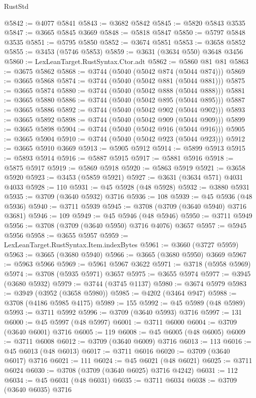 \begin{lexlean}{RustStd}
\begin{coremodule}
@5842 := @4077 @5841
@5843 := @3682 @5842
@5845 := @5820 @5843 @3535
@5847 := @3665 @5845 @3669
@5848 := @5818 @5847
@5850 := @5797 @5848 @3535
@5851 := @5795 @5850
@5852 := @3674 @5851
@5853 := @3658 @5852
@5855 := @3453 (@5746 @5853)
@5859 := @3631 (@3634 @550) @3648 @3456
@5860 := LexLeanTarget.RustSyntax.Ctor.adt
@5862 := @5860 @81 @81
@5863 := @3675 @5862
@5868 := @3744 (@5040 (@5042 @874 (@5044 @874)))
@5869 := @3665 @5868
@5874 := @3744 (@5040 (@5042 @881 (@5044 @881)))
@5875 := @3665 @5874
@5880 := @3744 (@5040 (@5042 @888 (@5044 @888)))
@5881 := @3665 @5880
@5886 := @3744 (@5040 (@5042 @895 (@5044 @895)))
@5887 := @3665 @5886
@5892 := @3744 (@5040 (@5042 @902 (@5044 @902)))
@5893 := @3665 @5892
@5898 := @3744 (@5040 (@5042 @909 (@5044 @909)))
@5899 := @3665 @5898
@5904 := @3744 (@5040 (@5042 @916 (@5044 @916)))
@5905 := @3665 @5904
@5910 := @3744 (@5040 (@5042 @923 (@5044 @923)))
@5912 := @3665 @5910 @3669
@5913 := @5905 @5912
@5914 := @5899 @5913
@5915 := @5893 @5914
@5916 := @5887 @5915
@5917 := @5881 @5916
@5918 := @5875 @5917
@5919 := @5869 @5918
@5920 := @5863 @5919
@5921 := @3658 @5920
@5923 := @3453 (@5859 @5921)
@5927 := @3631 (@3634 @571) @4031 @4033
@5928 := 110
@5931 := @45 @5928 (@48 @5928)
@5932 := @3880 @5931
@5935 := @3709 (@3640 @5932) @3716
@5936 := 108
@5939 := @45 @5936 (@48 @5936)
@5940 := @3711 @5939
@5945 := @3708 (@3709 (@3640 @5940) @3716 @3681)
@5946 := 109
@5949 := @45 @5946 (@48 @5946)
@5950 := @3711 @5949
@5956 := @3708 (@3709 (@3640 @5950) @3716 @4076) @3657
@5957 := @5945 @5956
@5958 := @3655 @5957
@5959 := LexLeanTarget.RustSyntax.Item.indexBytes
@5961 := @3660 (@3727 @5959)
@5963 := @3665 (@3680 @5940)
@5966 := @3665 (@3680 @5950) @3669
@5967 := @5963 @5966
@5969 := @5961 @5967 @3622
@5971 := @3718 (@5958 @5969)
@5974 := @3708 (@5935 @5971) @3657
@5975 := @3655 @5974
@5977 := @3945 (@3680 @5932)
@5979 := @3744 (@3745 @1137)
@5980 := @3674 @5979
@5983 := @3949 (@3952 (@3658 @5980))
@5985 := @4202 (@3464 @947)
@5988 := @3708 (@4186 @5985 @4175)
@5989 := 155
@5992 := @45 @5989 (@48 @5989)
@5993 := @3711 @5992
@5996 := @3709 (@3640 @5993) @3716
@5997 := 131
@6000 := @45 @5997 (@48 @5997)
@6001 := @3711 @6000
@6004 := @3709 (@3640 @6001) @3716
@6005 := 119
@6008 := @45 @6005 (@48 @6005)
@6009 := @3711 @6008
@6012 := @3709 (@3640 @6009) @3716
@6013 := 113
@6016 := @45 @6013 (@48 @6013)
@6017 := @3711 @6016
@6020 := @3709 (@3640 @6017) @3716
@6021 := 111
@6024 := @45 @6021 (@48 @6021)
@6025 := @3711 @6024
@6030 := @3708 (@3709 (@3640 @6025) @3716 @4242)
@6031 := 112
@6034 := @45 @6031 (@48 @6031)
@6035 := @3711 @6034
@6038 := @3709 (@3640 @6035) @3716

\end{coremodule}
\end{lexlean}
